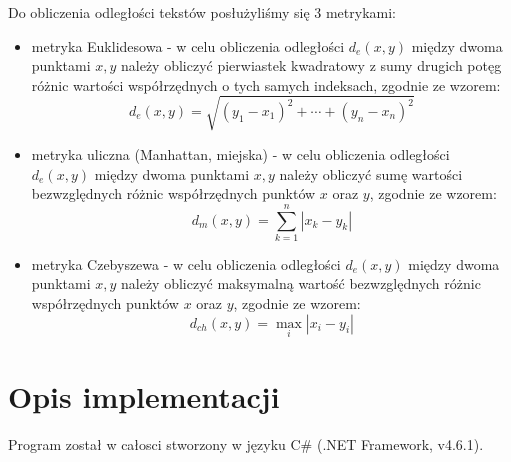 \documentclass{classrep}
\begin{document}
Do obliczenia odległości tekstów posłużyliśmy się 3 metrykami: \newline

\begin{itemize}
\item metryka Euklidesowa - w celu obliczenia odległości $ d_{e}(x,y) $ między dwoma punktami $ x, y $ należy obliczyć pierwiastek kwadratowy z sumy drugich potęg różnic wartości współrzędnych o tych samych indeksach, zgodnie ze wzorem:
$$
d_{e}(x,y)= \sqrt{ (y_{1} - x_{1})^2 + \cdots + (y_{n} - x_{n})^2 }
$$

\item metryka uliczna (Manhattan, miejska) - w celu obliczenia odległości $ d_{e}(x,y) $ między dwoma punktami $ x, y $ należy obliczyć sumę wartości bezwzględnych różnic współrzędnych punktów $ x $ oraz $ y $, zgodnie ze wzorem:
$$
d_{m}(x,y)= \sum_{k=1}^{n} | x_{k} - y_{k} |
$$

\item metryka Czebyszewa - w celu obliczenia odległości $ d_{e}(x,y) $ między dwoma punktami $ x, y $ należy obliczyć maksymalną wartość bezwzględnych różnic współrzędnych punktów $ x $ oraz $ y $, zgodnie ze wzorem:
$$
d_{ch}(x,y)= \max_{i} |x_{i} - y_{i}|
$$
\newline
\end{itemize}

\section{Opis implementacji}
Program został w całosci stworzony w języku C\# (.NET Framework, v4.6.1). 
\end{document}
